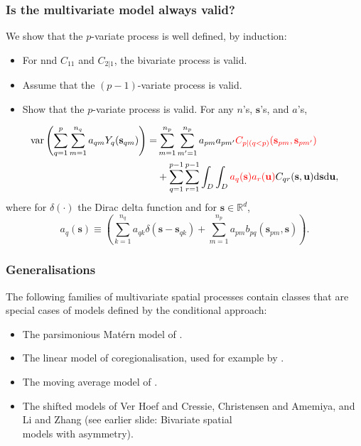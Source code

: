 \documentclass{beamer}
\newcommand{\intd} {\mathrm{d}}
\newcommand{\svec} {\textbf{s}}
\newcommand{\uvec} {\textbf{u}}
\newcommand{\s}{\mathbf{s}}
\newcommand{\var}{\mathrm{var}}
\newcommand{\red}{\textcolor{red}}%
\begin{document}

\begin{frame}
\frametitle{Is the multivariate model always valid?}

We show that the $p$-variate process is well defined, by induction:
\begin{itemize}
  \item For nnd $C_{11}$ and $C_{2|1}$, the bivariate process is valid.
  \item Assume that the $(p-1)$-variate process is valid.
  \item Show that the $p$-variate process is valid. For any $n$'s, $\s$'s, and $a$'s,
\end{itemize}

\vspace{-0.3in}
\begin{align*}
\var\left(\sum_{q=1}^p \sum_{m=1}^{n_q} a_{qm}Y_q(\svec_{qm})\right)=& \sum_{m=1}^{n_p}\sum_{m'=1}^{n_p}a_{pm}a_{pm'}\textcolor{red}{C_{p \mid  (q < p)}(\svec_{pm},\svec_{pm'})} \\
&+ \sum_{q=1}^{p-1}\sum_{r=1}^{p-1}\int_D\int_D\red{a_q(\svec)a_r(\uvec)}C_{qr}(\svec,\uvec)\intd \svec \intd \uvec,
\end{align*}
where for $\delta(\cdot)$ the Dirac delta function and for $\s\in\mathbb{R}^d$,
\begin{equation*}
a_q(\svec) \equiv \left(\sum_{k=1}^{n_q}a_{qk}\delta(\svec - \svec_{qk}) + \sum_{m=1}^{n_p}a_{pm}b_{pq}(\svec_{pm},\svec)\right).
\end{equation*}
\end{frame}


\begin{frame}
\frametitle{Generalisations}
\vspace{-1cm}
The following families of multivariate spatial processes contain classes that are special cases of models defined by the conditional approach:

\begin{itemize}
\item The parsimonious Mat{\'e}rn model of \cite{Gneitingetal2010}.\vfil
\item The linear model of coregionalisation, used for example by \cite{Wackernagel1995}.\vfil
\item The moving average model of \cite{verHoef_1998}.\vfil
\item The shifted models of Ver Hoef and Cressie, Christensen and Amemiya, and Li and Zhang (see earlier slide: Bivariate spatial \\models with asymmetry).
\end{itemize}
\vfill
\end{frame}
\end{document}
